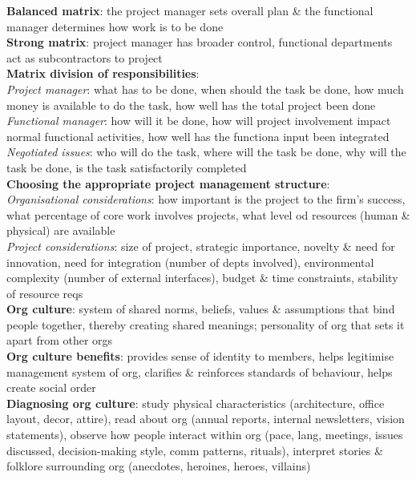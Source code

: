 \documentclass[a4paper]{article}
\begin{document}
\begin{multicols}{2}
        \textbf{Balanced matrix}: the project manager sets overall plan \& the functional manager determines how work is to be done\\
        \textbf{Strong matrix}: project manager has broader control, functional departments act as subcontractors to project\\
        \textbf{Matrix division of responsibilities}:\\
        \textit{Project manager}: what has to be done, when should the task be done, how much money is available to do the task, how well has the total project been done\\
        \textit{Functional manager}: how will it be done, how will project involvement impact normal functional activities, how well has the functiona input been integrated\\
        \textit{Negotiated issues}: who will do the task, where will the task be done, why will the task be done, is the task satisfactorily completed\\
        \textbf{Choosing the appropriate project management structure}:\\
        \textit{Organisational considerations}: how important is the project to the firm's success, what percentage of core work involves projects, what level od resources (human \& physical) are available\\
        \textit{Project considerations}: size of project, strategic importance, novelty \& need for innovation, need for integration (number of depts involved), environmental complexity (number of external interfaces), budget \& time constraints, stability of resource reqs\\
        \textbf{Org culture}: system of shared norms, beliefs, values \& assumptions that bind people together, thereby creating shared meanings; personality of org that sets it apart from other orgs\\
        \textbf{Org culture benefits}: provides sense of identity to members, helps legitimise management system of org, clarifies \& reinforces standards of behaviour, helps create social order\\
        \textbf{Diagnosing org culture}: study physical characteristics (architecture, office layout, decor, attire), read about org (annual reports, internal newsletters, vision statements), observe how people interact within org (pace, lang, meetings, issues discussed, decision-making style, comm patterns, rituals), interpret stories \& folklore surrounding org (anecdotes, heroines, heroes, villains)\\

\end{multicols}
\end{document}
